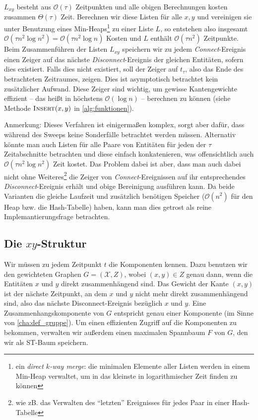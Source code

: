 $L_{xy}$ besteht aus $\mathcal{O}(\tau)$ Zeitpunkten und alle obigen Berechnungen kosten zusammen $\Theta(\tau)$ Zeit.
Berechnen wir diese Listen für alle $x,y$ und vereinigen sie unter Benutzung eines Min-Heaps\footnote{ein \emph{direct $k$-way merge}: die minimalen Elemente aller Listen werden in einem Min-Heap verwaltet, um in das kleinste in logarithmischer Zeit finden zu können} zu einer Liste $L$, so entstehen also insgesamt $\mathcal{O}(\tau n^2 \log n^2) = \mathcal{O}(\tau n^2 \log n)$ Kosten und $L$ enthält $\mathcal{O}(\tau n^2)$ Zeitpunkte.
Beim Zusammenführen der Listen $L_{xy}$ speichern wir zu jedem \emph{Connect}-Ereignis einen Zeiger auf das nächste \emph{Disconnect}-Ereignis der gleichen Entitäten, sofern dies existiert.
Falls dies nicht existiert, soll der Zeiger auf $t_\tau$, also das Ende des betrachteten Zeitraumes, zeigen.
Dies ist asymptotisch betrachtet kein zusätzlicher Aufwand.
Diese Zeiger sind wichtig, um gewisse Kantengewichte effizient -- das heißt in höchstens $\mathcal{O}(\log n)$ -- berechnen zu können (siehe Methode $\textsc{Insert}(x,y)$ in \cref{alg:funktionen}).

Anmerkung: Dieses Verfahren ist einigermaßen komplex, sorgt aber dafür, dass während des Sweeps keine Sonderfälle betrachtet werden müssen. 
Alternativ könnte man auch Listen für alle Paare von Entitäten für jeden der $\tau$ Zeitabschnitte betrachten und diese einfach konkatenieren, was offensichtlich auch $\mathcal{O}(\tau n^2 \log n^2)$ Zeit kostet.
Das Problem dabei ist aber, dass man auch dabei nicht ohne Weiteres\footnote{wie zB. das Verwalten des \enquote{letzten} Ereignisses für jedes Paar in einer Hash-Tabelle} die Zeiger von \emph{Connect}-Ereignissen auf ihr entsprechendes \emph{Disconnect}-Ereignis erhält und obige Bereinigung ausführen kann.
Da beide Varianten die gleiche Laufzeit und zusätzlich benötigen Speicher ($\mathcal{O}(n^2)$ für den Heap bzw. die Hash-Tabelle) haben, kann man dies getrost als reine Implemantierungsfrage betrachten.

\subsection{Die $xy$-Struktur} %
\label{sub:xy_struktur}
Wir müssen zu jedem Zeitpunkt $t$ die Komponenten kennen.
Dazu benutzen wir den gewichteten Graphen $G=(\mathcal{X},Z)$, wobei $(x,y) \in Z$ genau dann, wenn die Entitäten $x$ und $y$ direkt zusammenhängend sind.
Das Gewicht der Kante $(x,y)$ ist der nächste Zeitpunkt, an dem $x$ und $y$ nicht mehr direkt zusammenhängend sind, also das nächste Disconnect-Ereignis bezüglich $x$ und $y$.
Eine Zusammenhangskomponente von $G$ entspricht genau einer Komponente (im Sinne von \cref{cha:def_gruppe}).
Um einen effizienten Zugriff auf die Komponenten zu bekommen, verwalten wir außerdem einen maximalen Spannbaum $F$ von $G$, den wir als ST-Baum speichern.

